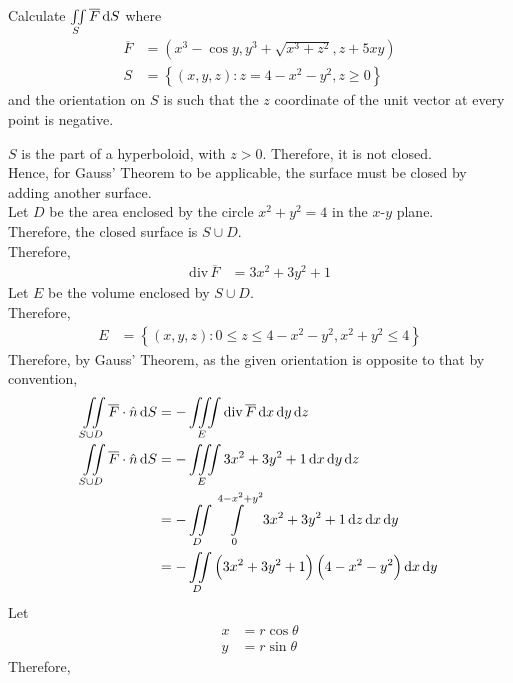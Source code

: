 \documentclass[fleqn, a4paper, 12pt, twoside]{article}
\theoremstyle{definition}
\theoremstyle{theorem}
\newcommand{\divergence}{\mathrm{div\,}}
\begin{document}
\begin{question}
	Calculate $\iint\limits_{S} \overline{F} \dif S$ where
	\begin{align*}
		\overline{F} &= \left( x^3 - \cos y , y^3 + \sqrt{x^3 + z^2} , z + 5 x y \right)\\
		S &= \left\{ (x,y,z) : z = 4 - x^2 - y^2 , z \ge 0 \right\}
	\end{align*}
	and the orientation on $S$ is such that the $z$ coordinate of the unit vector at every point is negative.
\end{question}

\begin{solution}
	$S$ is the part of a hyperboloid, with $z > 0$.
	Therefore, it is not closed.\\
	Hence, for Gauss' Theorem to be applicable, the surface must be closed by adding another surface.\\
	Let $D$ be the area enclosed by the circle $x^2 + y^2 = 4$ in the $x$-$y$ plane.\\
	Therefore, the closed surface is $S \cup D$.\\
	Therefore,
	\begin{align*}
		\divergence \overline{F} &= 3 x^2 + 3 y^2 + 1
	\end{align*}
	Let $E$ be the volume enclosed by $S \cup D$.\\
	Therefore,
	\begin{align*}
		E &= \left\{ (x,y,z) : 0 \le z \le 4 - x^2 - y^2 , x^2 + y^2 \le 4 \right\}
	\end{align*}
	Therefore, by Gauss' Theorem, as the given orientation is opposite to that by convention,
	\begin{align*}
		\iint\limits_{S \cup D} \overline{F} \cdot \hat{n} \dif S &= -\iiint\limits_{E} \divergence \overline{F} \dif x \dif y \dif z\\
		\iint\limits_{S \cup D} \overline{F} \cdot \hat{n} \dif S &= -\iiint\limits_{E} 3 x^2 + 3 y^2 + 1 \dif x \dif y \dif z\\
		&= -\iint\limits_{D} \int\limits_{0}^{4 - x^2 + y^2} 3 x^2 + 3 y^2 + 1 \dif z \dif x \dif y\\
		&= -\iint\limits_{D} \left( 3 x^2 + 3 y^2 + 1 \right) \left( 4 - x^2 - y^2 \right) \dif x \dif y
	\end{align*}
	Let
	\begin{align*}
		x &= r \cos \theta\\
		y &= r \sin \theta
	\end{align*}
	Therefore,
	\begin{align*}

\end{align*}
\end{solution}
\end{document}
